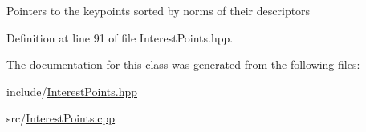 Pointers to the keypoints sorted by norms of their descriptors 

Definition at line 91 of file Interest\+Points.\+hpp.



The documentation for this class was generated from the following files\+:\begin{DoxyCompactItemize}
\item 
include/\hyperlink{_interest_points_8hpp}{Interest\+Points.\+hpp}\item 
src/\hyperlink{_interest_points_8cpp}{Interest\+Points.\+cpp}\end{DoxyCompactItemize}
